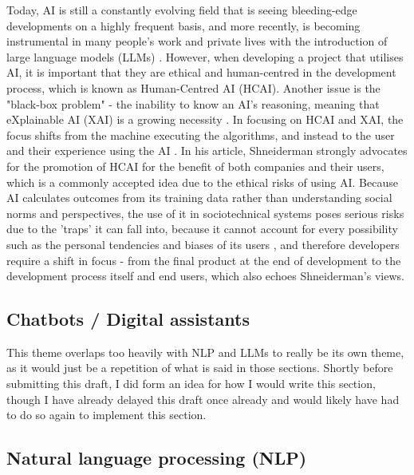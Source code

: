 \documentclass[12pt]{report}
\begin{document}
    Today, AI is still a constantly evolving field that is seeing bleeding-edge developments on a 
    highly frequent basis, and more recently, is becoming instrumental in many people's work and private lives 
    with the introduction of large language models (LLMs) \autocite{AIDigitalAssistants}.
    However, when developing a project that utilises AI, it is important that 
    they are ethical and human-centred in the development process, which is known as Human-Centred AI (HCAI). 
    Another issue is the "black-box problem" - the inability to know an AI's reasoning, meaning that 
    eXplainable AI (XAI) is a growing necessity \autocite{miro-nicolau_comprehensive_2025}. In focusing on 
    HCAI and XAI, the focus shifts from the machine executing the algorithms, and instead to the user and their experience 
    using the AI \autocite{AIEthics}. In his article, Shneiderman strongly advocates for the 
    promotion of HCAI for the benefit of both companies and their users, which is a commonly accepted 
    idea due to the ethical risks of using AI. Because AI calculates outcomes from its training data rather 
    than understanding social norms and perspectives, the use of it in sociotechnical systems poses serious risks 
    due to the 'traps' it can fall into, because it cannot account for every possibility such as the personal tendencies 
    and biases of its users \autocite{selbst_fairness_2019}, and therefore developers require a shift in focus - from the final product
    at the end of development to the development process itself and end users, which also echoes Shneiderman's views. 

    \subsection{Chatbots / Digital assistants}
    \begin{tcolorbox}[colback=red!5!white,colframe=red!75!black,title=Missing section - To be done in future draft/final.]
        This theme overlaps too heavily with NLP and LLMs to really be its own theme, as it would just be a repetition
        of what is said in those sections. Shortly before submitting this draft, I did form an idea for how I would write 
        this section, though I have already delayed this draft once already and would likely have had to do so again to implement
        this section.
    \end{tcolorbox}

    \pagebreak 
    \subsection{Natural language processing (NLP)}
\end{document}
